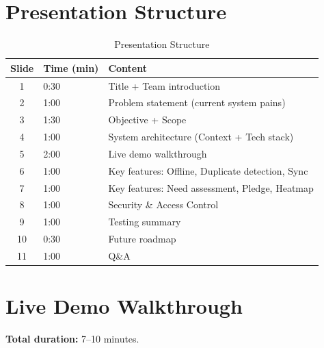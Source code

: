 
\section{Presentation Structure}
\begin{table}[H]
\centering
\caption{Presentation Structure}
\label{tab:presentation}
\begin{tabularx}{\textwidth}{@{}clX@{}}
\toprule
Slide & Time (min) & Content \\
\midrule
1 & 0:30 & Title + Team introduction \\
2 & 1:00 & Problem statement (current system pains) \\
3 & 1:30 & Objective + Scope \\
4 & 1:00 & System architecture (Context + Tech stack) \\
5 & 2:00 & Live demo walkthrough \\
6 & 1:00 & Key features: Offline, Duplicate detection, Sync \\
7 & 1:00 & Key features: Need assessment, Pledge, Heatmap \\
8 & 1:00 & Security \& Access Control \\
9 & 1:00 & Testing summary \\
10 & 0:30 & Future roadmap \\
11 & 1:00 & Q\&A \\
\bottomrule
\end{tabularx}
\end{table}

\section{Live Demo Walkthrough}
\textbf{Total duration:} 7--10 minutes.


